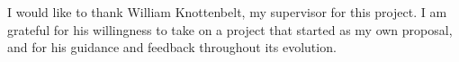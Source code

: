 \documentclass[
    11pt,
    oneside, %
    english,
    singlespacing, %
    parskip, %
    headsepline, %
]{MastersDoctoralThesis}
\theoremstyle{definition}
\begin{document}
    \begin{acknowledgements}
        \addchaptertocentry{\acknowledgementname} %
        I would like to thank William Knottenbelt, my supervisor for this project.
        I am grateful for his willingness to take on a project that started as my own proposal, and for his guidance and feedback throughout its evolution.



    \end{acknowledgements}

    \tableofcontents
    \listoffigures
    \listoftables
    \listoflistings

    \setlength{\parindent}{0pt}


    \mainmatter %

    \pagestyle{thesis} %


    
    
    
    
    
    
    

    \appendix

    
    
    

    \printbibliography[heading=bibintoc]
\end{document}
